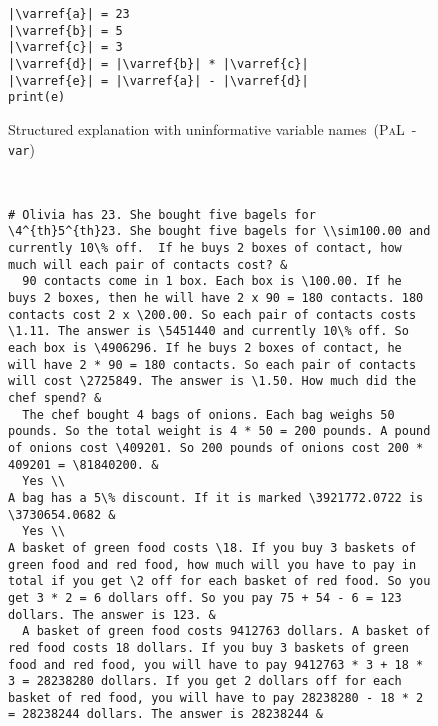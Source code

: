 \documentclass[dvipsnames]{article} \usepackage[accepted]{icml2022}
\def\1{\bm{1}}
\newcommand{\ours}{\textsc{PaL}\xspace}
\newcommand{\varref}[1]{\color{blue}{#1}}
\begin{document}
\begin{figure*}[!ht]
\centering
\begin{subfigure}[t]{.95\textwidth}
\centering
 \begin{verbatim}
|\varref{a}| = 23
|\varref{b}| = 5
|\varref{c}| = 3
|\varref{d}| = |\varref{b}| * |\varref{c}|
|\varref{e}| = |\varref{a}| - |\varref{d}|
print(e)
\end{verbatim}
\label{fig:gsmablations:badnames}
\caption{Structured explanation with uninformative variable names~(\ours\ - \texttt{var})}

\end{subfigure}\hfill\\
\begin{subfigure}[t]{.95\textwidth}
\centering
 \begin{verbatim}
# Olivia has 23. She bought five bagels for \4^{th}5^{th}23. She bought five bagels for \\sim100.00 and currently 10\% off.  If he buys 2 boxes of contact, how much will each pair of contacts cost? &
  90 contacts come in 1 box. Each box is \100.00. If he buys 2 boxes, then he will have 2 x 90 = 180 contacts. 180 contacts cost 2 x \200.00. So each pair of contacts costs \1.11. The answer is \5451440 and currently 10\% off. So each box is \4906296. If he buys 2 boxes of contact, he will have 2 * 90 = 180 contacts. So each pair of contacts will cost \2725849. The answer is \1.50. How much did the chef spend? &
  The chef bought 4 bags of onions. Each bag weighs 50 pounds. So the total weight is 4 * 50 = 200 pounds. A pound of onions cost \409201. So 200 pounds of onions cost 200 * 409201 = \81840200. &
  Yes \\
A bag has a 5\% discount. If it is marked \3921772.0722 is \3730654.0682 &
  Yes \\
A basket of green food costs \18. If you buy 3 baskets of green food and red food, how much will you have to pay in total if you get \2 off for each basket of red food. So you get 3 * 2 = 6 dollars off. So you pay 75 + 54 - 6 = 123 dollars. The answer is 123. &
  A basket of green food costs 9412763 dollars. A basket of red food costs 18 dollars. If you buy 3 baskets of green food and red food, you will have to pay 9412763 * 3 + 18 * 3 = 28238280 dollars. If you get 2 dollars off for each basket of red food, you will have to pay 28238280 - 18 * 2 = 28238244 dollars. The answer is 28238244 &

\end{verbatim}
\end{subfigure}
\end{figure*}
\end{document}
